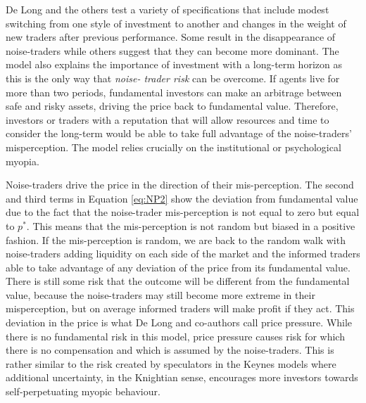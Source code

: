 \documentclass[12pt, a4paper, oneside]{article} %
\begin{document}
De Long and the others test a variety of specifications that include modest switching from one style of investment to another and changes in the weight of new traders after previous performance.  Some result in the disappearance of noise-traders while others suggest that they can become more dominant.  The model also explains the importance of investment with a long-term horizon as this is the only way that \emph{noise- trader risk} can be overcome.  If agents live for more than two periods, fundamental investors can make an arbitrage between safe and risky assets, driving the price back to fundamental value.  Therefore, investors or traders with a reputation that will allow resources and time to consider the long-term would be able to take full advantage of the noise-traders' misperception.  The model relies crucially on the institutional or psychological myopia. 

Noise-traders drive the price in the direction of their mis-perception.    The second and third terms in Equation \ref{eq:NP2} show the deviation from fundamental value due to the fact that the noise-trader mis-perception is not equal to zero but equal to $p^*$.  This means that the mis-perception is not random but biased in a positive fashion.  If the mis-perception is random, we are back to the random walk with noise-traders adding liquidity on each side of the market and the informed traders able to take advantage of any deviation of the price from its fundamental value.  There is still some risk that the outcome will be different from the fundamental value, because the noise-traders may still become more extreme in their misperception, but on average informed traders will make profit if they act.  This deviation in the price is what De Long and co-authors call price pressure.  While there is no fundamental risk in this model, price pressure causes risk for which there is no compensation and which is assumed by the noise-traders.  This is rather similar to the risk created by speculators in the Keynes models where additional uncertainty, in the Knightian sense, encourages more investors towards self-perpetuating myopic behaviour.   

\end{document}
